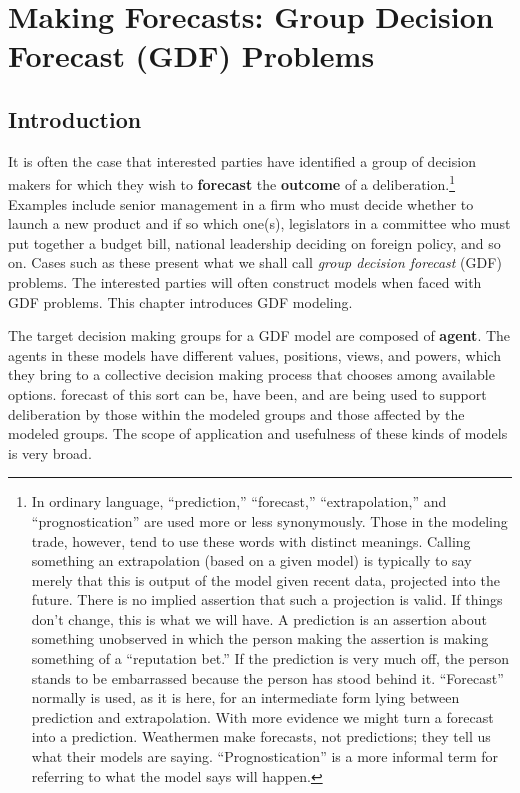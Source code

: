 %
\chapter{Making Forecasts: Group Decision Forecast (GDF) Problems\label{ch:gdp}}

\section{Introduction} 

It is often the case that interested parties  have identified a group of decision makers for which they wish to {\bf   {forecast}} the {\bf  {outcome}} of a deliberation.\footnote{In ordinary language, ``prediction,'' ``forecast,'' ``extrapolation,'' and ``prognostication'' are used more or less synonymously. Those in the modeling trade, however, tend to use these words with distinct meanings.  Calling something an extrapolation (based on a given model) is typically to say merely  that this is output of the model given recent data, projected into the future. There is no implied assertion that such a projection is valid. If things don't change, this is what we will have. A prediction is an assertion about something unobserved in which the person making the assertion is making something of a ``reputation bet.'' If the prediction is very much off, the person stands to be embarrassed because the person has stood behind it. ``Forecast'' normally is used, as it is here, for an intermediate form lying between prediction and extrapolation.  With more evidence we might turn a forecast into a prediction. Weathermen make forecasts, not predictions; they tell us what their models are saying. ``Prognostication'' is a more informal term for referring to what the model says will happen.}
Examples include senior management in a firm who must decide whether to launch a new product and if so which one(s), legislators in a committee who must put together a budget bill, national leadership deciding on foreign policy, and so on. Cases such as these present what we shall call \emph{group decision forecast} (GDF) problems. The interested parties will often construct models when faced with GDF problems. This chapter introduces GDF modeling.

The target decision making groups for a GDF model are composed of  {\bf  {agent}}. The agents in these models have different values, positions,   views, and powers, which they bring to a collective decision making process that  chooses among available options.    {forecast} of this sort can be, have been, and are being used to support deliberation by those within the modeled groups and those affected by the modeled groups.  The scope of application and usefulness of these kinds of models is very broad.

